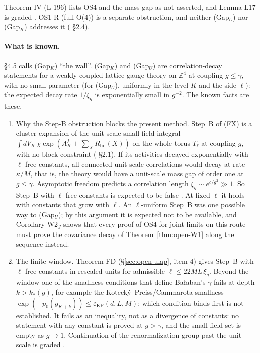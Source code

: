 Theorem IV (L-196) lists OS4 and the mass gap as not asserted, and Lemma L17 is graded . OS1-R (full O(4)) is a separate obstruction, and neither (Gap$_U$) nor (Gap$_K$) addresses it ( \S2.4).

\paragraph{What is known.}  \S4.5 calls (Gap$_K$) ``the wall''. (Gap$_K$) and (Gap$_U$) are correlation-decay statements for a weakly coupled lattice gauge theory on $\mathbb Z^4$ at coupling $g\le\gamma$, with no small parameter (for (Gap$_U$), uniformly in the level $K$ and the side $\ell$): the expected decay rate $1/\xi_g$ is exponentially small in $g^{-2}$. The known facts are these.
\begin{enumerate}
\item Why the Step-B obstruction blocks the present method. Step~B of (FX) is a cluster expansion of the unit-scale small-field integral $\int dV_K\,\chi\exp(A^f_K+\sum_XR_{\mathrm{fin}}(X))$ on the whole torus $T_\ell$ at coupling $g$, with no block constraint ( \S2.1). If its activities decayed exponentially with $\ell$-free constants, all connected unit-scale correlations would decay at rate $\kappa/M$, that is, the theory would have a unit-scale mass gap of order one at $g\le\gamma$. Asymptotic freedom predicts a correlation length $\xi_g\sim e^{c/g^2}\gg1$. So Step~B with $\ell$-free constants is expected to be false . At fixed $\ell$ it holds with constants that grow with $\ell$. An $\ell$-uniform Step~B was one possible way to (Gap$_U$); by this argument it is expected not to be available, and Corollary W2$_J$ shows that every proof of OS4 for joint limits on this route must prove the covariance decay of Theorem~\ref{thm:open-W1} along the sequence instead.
\item The finite window. Theorem FD (\S\ref{sec:open-ulap}, item 4) gives Step~B with $\ell$-free constants in rescaled units for admissible $\ell\le22ML\,\xi_g$. Beyond the window one of the smallness conditions that define Ba{\l}aban's $\gamma$ fails at depth $k>k_*(g)$, for example the Kotecký--Preiss/Cammarota smallness $\exp(-p_0(g_{K+k}))\le\varepsilon_{\mathrm{KP}}(d,L,M)$; which condition binds first is not established. It fails as an inequality, not as a divergence of constants: no statement with any constant is proved at $g>\gamma$, and the small-field set is empty as $g\to1$. Continuation of the renormalization group past the unit scale is graded .

\end{enumerate}
